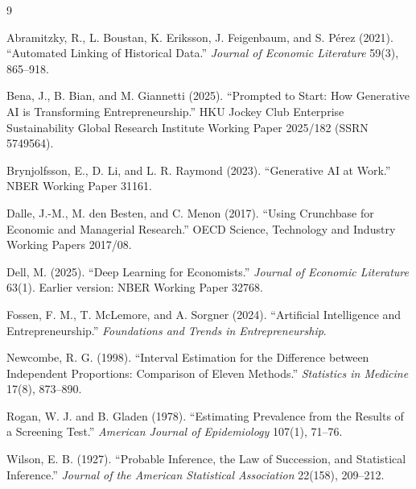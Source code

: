 \documentclass[11pt]{article}
\begin{document}
\begin{thebibliography}{9}
\setlength{\itemsep}{3pt}

Abramitzky, R., L. Boustan, K. Eriksson, J. Feigenbaum, and S. P\'erez (2021).
``Automated Linking of Historical Data.''
\emph{Journal of Economic Literature} 59(3), 865--918.

Bena, J., B. Bian, and M. Giannetti (2025).
``Prompted to Start: How Generative AI is Transforming Entrepreneurship.''
HKU Jockey Club Enterprise Sustainability Global Research Institute
Working Paper 2025/182 (SSRN 5749564).

Brynjolfsson, E., D. Li, and L. R. Raymond (2023).
``Generative AI at Work.'' NBER Working Paper 31161.

Dalle, J.-M., M. den Besten, and C. Menon (2017).
``Using Crunchbase for Economic and Managerial Research.''
OECD Science, Technology and Industry Working Papers 2017/08.

Dell, M. (2025). ``Deep Learning for Economists.''
\emph{Journal of Economic Literature} 63(1).
Earlier version: NBER Working Paper 32768.

Fossen, F. M., T. McLemore, and A. Sorgner (2024).
``Artificial Intelligence and Entrepreneurship.''
\emph{Foundations and Trends in Entrepreneurship}.

Newcombe, R. G. (1998). ``Interval Estimation for the Difference between
Independent Proportions: Comparison of Eleven Methods.''
\emph{Statistics in Medicine} 17(8), 873--890.

Rogan, W. J. and B. Gladen (1978). ``Estimating Prevalence from the Results of
a Screening Test.'' \emph{American Journal of Epidemiology} 107(1), 71--76.

Wilson, E. B. (1927). ``Probable Inference, the Law of Succession, and
Statistical Inference.'' \emph{Journal of the American Statistical
Association} 22(158), 209--212.

\end{thebibliography}
\end{document}
